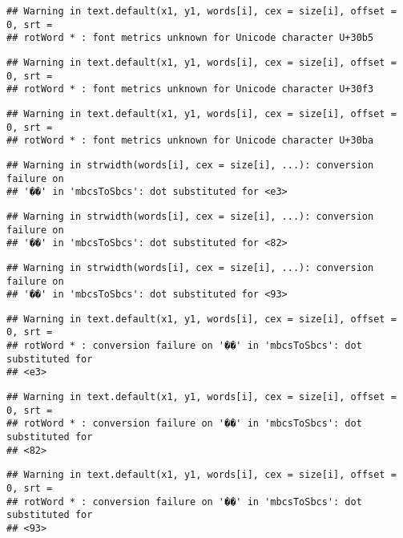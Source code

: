 \documentclass[]{article}
\begin{document}
\begin{verbatim}
## Warning in text.default(x1, y1, words[i], cex = size[i], offset = 0, srt =
## rotWord * : font metrics unknown for Unicode character U+30b5
\end{verbatim}

\begin{verbatim}
## Warning in text.default(x1, y1, words[i], cex = size[i], offset = 0, srt =
## rotWord * : font metrics unknown for Unicode character U+30f3
\end{verbatim}

\begin{verbatim}
## Warning in text.default(x1, y1, words[i], cex = size[i], offset = 0, srt =
## rotWord * : font metrics unknown for Unicode character U+30ba
\end{verbatim}

\begin{verbatim}
## Warning in strwidth(words[i], cex = size[i], ...): conversion failure on
## '��' in 'mbcsToSbcs': dot substituted for <e3>
\end{verbatim}

\begin{verbatim}
## Warning in strwidth(words[i], cex = size[i], ...): conversion failure on
## '��' in 'mbcsToSbcs': dot substituted for <82>
\end{verbatim}

\begin{verbatim}
## Warning in strwidth(words[i], cex = size[i], ...): conversion failure on
## '��' in 'mbcsToSbcs': dot substituted for <93>
\end{verbatim}

\begin{verbatim}
## Warning in text.default(x1, y1, words[i], cex = size[i], offset = 0, srt =
## rotWord * : conversion failure on '��' in 'mbcsToSbcs': dot substituted for
## <e3>
\end{verbatim}

\begin{verbatim}
## Warning in text.default(x1, y1, words[i], cex = size[i], offset = 0, srt =
## rotWord * : conversion failure on '��' in 'mbcsToSbcs': dot substituted for
## <82>
\end{verbatim}

\begin{verbatim}
## Warning in text.default(x1, y1, words[i], cex = size[i], offset = 0, srt =
## rotWord * : conversion failure on '��' in 'mbcsToSbcs': dot substituted for
## <93>
\end{verbatim}
\end{document}
